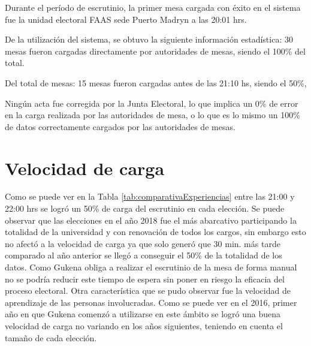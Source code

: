 Durante el período de escrutinio, la primer mesa cargada con éxito en el sistema fue la unidad electoral FAAS sede Puerto Madryn a las 20:01 hrs.

De la utilización del sistema, se obtuvo la siguiente información estadística:
30 mesas fueron cargadas directamente por autoridades de mesas, siendo el 100\% del total.

Del total de mesas:
15 mesas fueron cargadas antes de las 21:10 hs, siendo el 50\%,

Ningún acta fue corregida por la Junta Electoral, lo que implica un 0\% de error en la carga realizada por las autoridades de mesa, o lo que es lo mismo un 100\% de datos correctamente cargados por las autoridades de mesas.

\section{Velocidad de carga}

Como se puede ver en la Tabla \ref{tab:comparativaExperiencias} entre las 21:00 y 22:00 hrs se logró un 50\% de carga del escrutinio  en cada elección. Se puede observar que las elecciones en el año 2018 fue el más abarcativo participando la totalidad de la universidad y con renovación de todos los cargos, sin embargo esto no afectó a la velocidad de carga ya que solo generó que 30 min. más tarde comparado al año anterior se llegó a conseguir el 50\% de la totalidad de los datos. Como Gukena obliga a realizar el escrutinio de la mesa de forma manual no se podría reducir este tiempo de espera sin poner en riesgo la eficacia del proceso electoral. Otra característica que se pudo observar fue la velocidad de aprendizaje de las personas involucradas. Como se puede ver en el 2016, primer año en que Gukena comenzó a utilizarse en este ámbito se logró una buena velocidad de carga no variando en los años siguientes, teniendo en cuenta el tamaño de cada elección.


